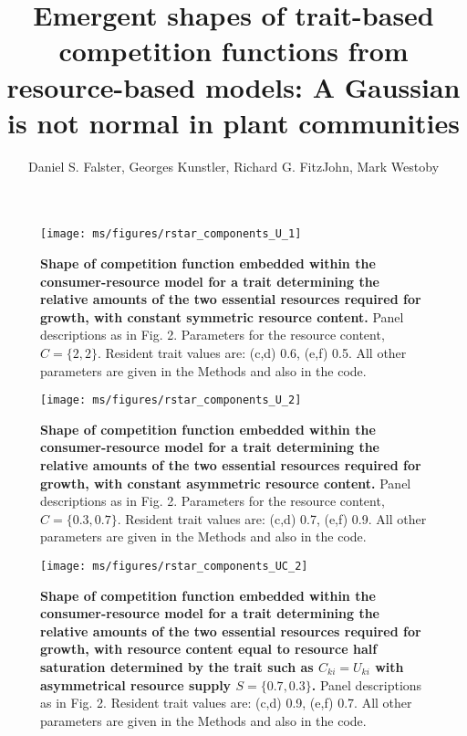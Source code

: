 \documentclass[10pt,twoside]{article}
\title{Emergent shapes of trait-based competition functions from resource-based models: A Gaussian is not normal in plant communities}
\date{}
\author{Daniel S. Falster, Georges Kunstler, Richard G. FitzJohn, Mark Westoby}
\makeatletter
\renewcommand{\thefigure}{S\@arabic\c@figure}
\makeatother
\begin{document}
\maketitle

\setcounter{secnumdepth}{1}

\renewcommand{\thefigure}{S\arabic{figure}}
\setcounter{figure}{0}

\begin{figure}[ht]
 \centering
	\texttt{[image: ms/figures/rstar\_components\_U\_1]}
 \caption{{\bf Shape of competition function embedded within the consumer-resource model for a trait determining the relative amounts of the two essential resources required for growth, with constant symmetric resource content.} Panel descriptions as in Fig. 2. Parameters for the resource content, $C = \{2, 2\}$. Resident trait values are: (c,d) 0.6, (e,f) 0.5. All other parameters are given in the Methods and also in the code.}
 \label{figS:Rstar_U1}
\end{figure}

\newpage
\begin{figure}[ht]
 \centering
	\texttt{[image: ms/figures/rstar\_components\_U\_2]}
 \caption{{\bf Shape of competition function embedded within the consumer-resource model for a trait determining the relative amounts of the two essential resources required for growth, with constant asymmetric resource content.} Panel descriptions as in Fig. 2. Parameters for the resource content, $C = \{0.3, 0.7\}$. Resident trait values are: (c,d) 0.7, (e,f) 0.9. All other parameters are given in the Methods and also in the code.}
 \label{figS:Rstar_U2}
\end{figure}

\newpage
\begin{figure}[ht]
 \centering
 \texttt{[image: ms/figures/rstar\_components\_UC\_2]}
 \caption{{\bf Shape of competition function embedded within the consumer-resource model for a trait determining the relative amounts of the two essential resources required for growth, with resource content equal to resource half saturation determined by the trait such as $C_{ki} = U_{ki}$ with asymmetrical resource supply $S = \{0.7, 0.3\}$.} Panel descriptions as in Fig. 2. Resident trait values are: (c,d) 0.9, (e,f) 0.7. All other parameters are given in the Methods and also in the code.} 
 \label{fig:Srstar_components_UC2}
\end{figure}
\end{document}
